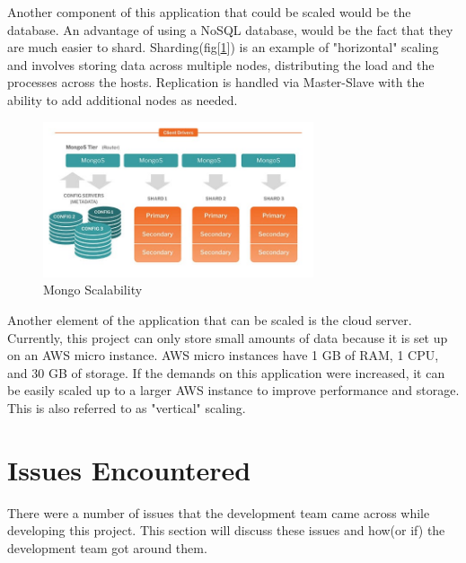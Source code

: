 Another component of this application that could be scaled would be the database. An advantage of using a NoSQL database\cite{han2011survey},
would be the fact that they are much easier to shard. Sharding(fig[\ref{fig:sharding}]) is an example of "horizontal" scaling and involves storing data across multiple nodes, distributing the load and the processes across the hosts. Replication is handled via Master-Slave with the ability to add additional nodes as needed. 

\begin{figure}[H]
    \centering
    \includegraphics[width=\textwidth, height=130pt]{img/Sharding.PNG}
    \caption{Mongo Scalability}
    \label{fig:sharding}
\end{figure}

\bigskip

Another element of the application that can be scaled is the cloud server. Currently, this project can only store small amounts of data because it is set up on an AWS micro instance.  AWS micro instances have 1 GB of RAM, 1 CPU, and 30 GB of storage. If the demands on this application were increased, it can be easily scaled up to a larger AWS instance to improve performance and storage. This is also referred to as "vertical" scaling. 

\section{Issues Encountered}
\label{sec:SystemEvaluationIssues}

There were a number of issues that the development team came across while developing this project. This section will discuss these issues and how(or if) the development team got around them.

